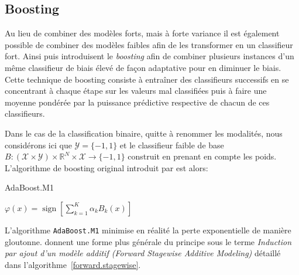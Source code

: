 \subsection{Boosting}

Au lieu de combiner des modèles forts, mais à forte variance il est également possible de combiner des modèles faibles afin de les transformer en un classifieur fort. Ainsi \citet{Breiman1998} puis \citet{Schapire1990} introduisent le \emph{boosting} afin de combiner plusieurs instances d'un même classifieur de biais élevé de façon adaptative pour en diminuer le biais. Cette technique de boosting consiste à entraîner des classifieurs successifs en se concentrant à chaque étape sur les valeurs mal classifiées puis à faire une moyenne pondérée par la puissance prédictive respective de chacun de ces classifieurs.

Dans le cas de la classification binaire, quitte à renommer les modalités, nous considérons ici que $\mathcal{Y} = \{-1 , 1 \}$ et le classifieur faible de base $B : (\mathcal{X} \times \mathcal{Y} ) \times \mathbb{R}^N \times \mathcal{X} \rightarrow \{-1,1\}$ construit en prenant en compte les poids. L'algorithme de boosting original introduit par \citet{Freund2003} est alors:

\begin{algorithm}
\caption{AdaBoost.M1} \label{adaboost.m1}
\begin{algorithmic}
    
    
    \EndFor
    \State \Return $\varphi (x) = \operatorname{sign} \left[ \sum_{k=1}^K \alpha_k B_k (x) \right]$
    \EndProcedure
\end{algorithmic}    
\end{algorithm}

L'algorithme \texttt{AdaBoost.M1} minimise en réalité la perte exponentielle de manière gloutonne. \citet{Trevor} donnent une forme plus générale du principe sous le terme \emph{Induction par ajout d'un modèle additif (Forward Stagewise Additive Modeling)} détaillé dans l'algorithme~\ref{forward.stagewise}.

